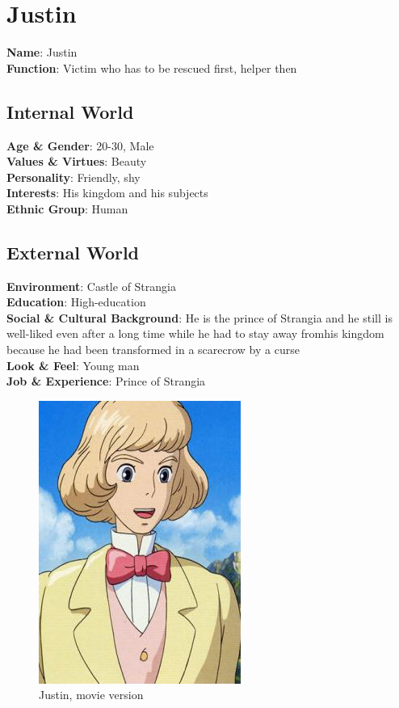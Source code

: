 \section{Justin}

\begin{minipage}{0.5\textwidth}
\textbf{Name}: Justin \\
\textbf{Function}: Victim who has to be rescued first, helper then

\subsection{Internal World}

\textbf{Age \& Gender}: 20-30, Male \\
\textbf{Values \& Virtues}: Beauty \\
\textbf{Personality}: Friendly, shy \\
\textbf{Interests}: His kingdom and his subjects \\
\textbf{Ethnic Group}: Human

\subsection{External World}
\textbf{Environment}: Castle of Strangia\\
\textbf{Education}: High-education \\
\textbf{Social \& Cultural Background}: He is the prince of Strangia and he still is well-liked even after a long time while he had to stay away fromhis kingdom because he had been transformed in a scarecrow by a curse \\
\textbf{Look \& Feel}: Young man   \\
\textbf{Job \& Experience}: Prince of Strangia \\

\end{minipage}%
%
\hfill\begin{minipage}{0.4\textwidth}
  \begin{figure}[H]
  \includegraphics{Images/Characters/justin}
  \caption{Justin, movie version }
\end{figure}
\end{minipage}

